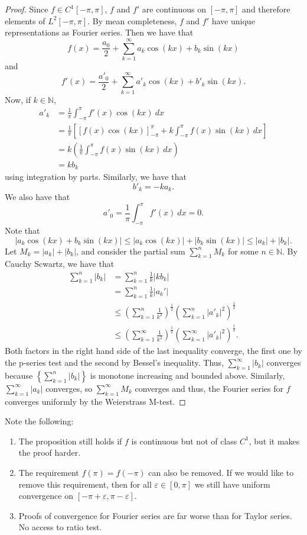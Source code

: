 \documentclass[11pt]{article}
\theoremstyle{definition}
\newcommand{\N}{\mathbb{N}}
\begin{document}
\begin{proof}
Since $f\in C^1[-\pi,\pi]$, $f$ and $f'$ are continuous on $[-\pi,\pi]$ and therefore elements of $L^2[-\pi,\pi]$. By mean completeness, $f$ and $f'$ have unique representations as Fourier series. Then we have that
$$
f(x)=\frac{a_0}{2}+\sum_{k=1}^\infty a_k\cos(kx)+b_k\sin(kx)
$$
and
$$
f'(x) = \frac{a'_0}{2}+\sum_{k=1}^\infty a'_k\cos(kx)+b'_k\sin(kx).
$$
Now, if $k\in\N$,
$$
\begin{aligned}
a'_k &= \frac{1}{\pi}\int_{-\pi}^\pi f'(x)\cos(kx)~dx\\
&=\frac{1}{\pi}\left[ \left[f(x)\cos(kx)\right]_{-\pi}^\pi +k\int_{-\pi}^\pi f(x)\sin(kx)~dx\right]\\
&=k\left(\frac{1}{\pi} \int_{-\pi}^\pi f(x)\sin(kx)~dx \right)\\
&=kb_k
\end{aligned}
$$
using integration by parts. Similarly, we have that
$$
b'_k = -ka_k.
$$
We also have that
$$
a'_0=\frac{1}{\pi}\int_{-\pi}^\pi f'(x)~dx =0.
$$
Note that
$$
|a_k\cos(kx)+b_k\sin(kx)|\leq|a_k\cos(kx)|+|b_k\sin(kx)|\leq |a_k|+|b_k|.
$$
Let $M_k=|a_k|+|b_k|$, and consider the partial sum $\sum_{k=1}^n M_k$ for some $n\in\N$. By Cauchy Scwartz, we have that
$$
\begin{aligned}
\sum_{k=1}^n |b_k|&=\sum_{k=1}^n \frac{1}{k}|kb_k|\\ 
&= \sum_{k=1}^n \frac{1}{k}|a_k'|\\
&\leq \left(\sum_{k=1}^n \frac{1}{k^2}\right)^\frac{1}{2}\left(\sum_{k=1}^n |a'_k|^2\right)^\frac{1}{2}\\
&\leq \left(\sum_{k=1}^\infty \frac{1}{k^2}\right)^\frac{1}{2}\left(\sum_{k=1}^\infty |a'_k|^2\right)^\frac{1}{2}.
\end{aligned}
$$
Both factors in the right hand side of the last inequality converge, the first one by the p-series test and the second by Bessel's inequality. Thus, $\sum_{k=1}^\infty |b_k|$ converges because $\left\{\sum_{k=1}^n |b_k|\right\}$ is monotone increasing and bounded above. Similarly, $\sum_{k=1}^\infty|a_k|$ converges, so $\sum_{k=1}^\infty M_k$ converges and thus, the Fourier series for $f$ converges uniformly by the Weierstrass M-test.
\end{proof}

\note Note the following:
\begin{enumerate}
    \item The proposition still holds if $f$ is continuous but not of class $C^1$, but it makes the proof harder. 
    \item The requirement $f(\pi)=f(-\pi)$ can also be removed. If we would like to remove this requirement, then for all $\varepsilon\in [0,\pi]$ we still have uniform convergence on $[-\pi+\varepsilon,\pi-\varepsilon]$.
    \item Proofs of convergence for Fourier series are far worse than for Taylor series. No access to ratio test.
\end{enumerate}
\end{document}
